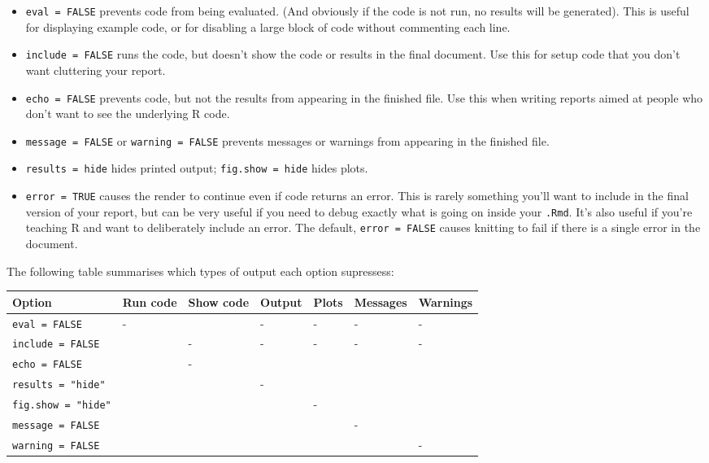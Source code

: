 \documentclass[]{book}
\begin{document}
\begin{itemize}
\item
  \texttt{eval\ =\ FALSE} prevents code from being evaluated. (And
  obviously if the code is not run, no results will be generated). This
  is useful for displaying example code, or for disabling a large block
  of code without commenting each line.
\item
  \texttt{include\ =\ FALSE} runs the code, but doesn't show the code or
  results in the final document. Use this for setup code that you don't
  want cluttering your report.
\item
  \texttt{echo\ =\ FALSE} prevents code, but not the results from
  appearing in the finished file. Use this when writing reports aimed at
  people who don't want to see the underlying R code.
\item
  \texttt{message\ =\ FALSE} or \texttt{warning\ =\ FALSE} prevents
  messages or warnings from appearing in the finished file.
\item
  \texttt{results\ =\ \textquotesingle{}hide\textquotesingle{}} hides
  printed output;
  \texttt{fig.show\ =\ \textquotesingle{}hide\textquotesingle{}} hides
  plots.
\item
  \texttt{error\ =\ TRUE} causes the render to continue even if code
  returns an error. This is rarely something you'll want to include in
  the final version of your report, but can be very useful if you need
  to debug exactly what is going on inside your \texttt{.Rmd}. It's also
  useful if you're teaching R and want to deliberately include an error.
  The default, \texttt{error\ =\ FALSE} causes knitting to fail if there
  is a single error in the document.
\end{itemize}

The following table summarises which types of output each option
supressess:

\begin{longtable}[]{@{}lllllll@{}}
\toprule
Option & Run code & Show code & Output & Plots & Messages &
Warnings\tabularnewline
\midrule
\endhead
\texttt{eval\ =\ FALSE} & - & & - & - & - & -\tabularnewline
\texttt{include\ =\ FALSE} & & - & - & - & - & -\tabularnewline
\texttt{echo\ =\ FALSE} & & - & & & &\tabularnewline
\texttt{results\ =\ "hide"} & & & - & & &\tabularnewline
\texttt{fig.show\ =\ "hide"} & & & & - & &\tabularnewline
\texttt{message\ =\ FALSE} & & & & & - &\tabularnewline
\texttt{warning\ =\ FALSE} & & & & & & -\tabularnewline
\bottomrule
\end{longtable}
\end{document}
